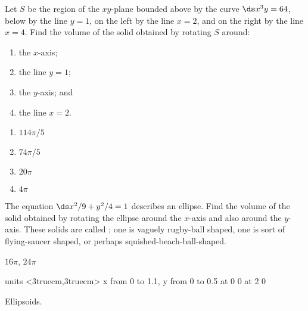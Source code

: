 \begin{enumialphparenastyle}
\begin{ex}
Let $S$ be the region of the $xy$-plane bounded above by the curve
$\ds x^3y=64$, below by the line $y=1$, on the left by  the line $x=2$, and
on the right by the line $x=4$.  Find
the volume of the solid obtained by rotating $S$ around:
\begin{multicols}{2}
\begin{enumerate}
	\item	the $x$-axis;
	\item	the line $y=1$;
	\item	the $y$-axis; and
	\item	the line $x=2$.
\end{enumerate}
\end{multicols}
\begin{sol}
\begin{multicols}{2}
\begin{enumerate}
	\item	$114\pi/5$
	\item	$74\pi/5$
	\item	$20\pi$
	\item	$4\pi$
\end{enumerate}
\end{multicols}
\end{sol}
\end{ex}

\begin{ex}
 The equation $\ds x^2/9+y^2/4=1$ describes an ellipse.  Find the
volume of the solid obtained by rotating the ellipse around the
$x$-axis and also around the $y$-axis. These solids are
called ; one is vaguely rugby-ball shaped, one is
sort of flying-saucer shaped, or perhaps squished-beach-ball-shaped.
\begin{sol}
 $16\pi$, $24\pi$
\end{sol}
\end{ex}


\figure[H]
\centerline{\vbox{\beginpicture
\normalgraphs
\setcoordinatesystem units <3truecm,3truecm>
\setplotarea x from 0 to 1.1, y from 0 to 0.5
 at 0 0
 at 2 0
\endpicture}}
\caption{Ellipsoids.\label{fig:ellipsoids}}
\endfigure



\end{enumialphparenastyle}
